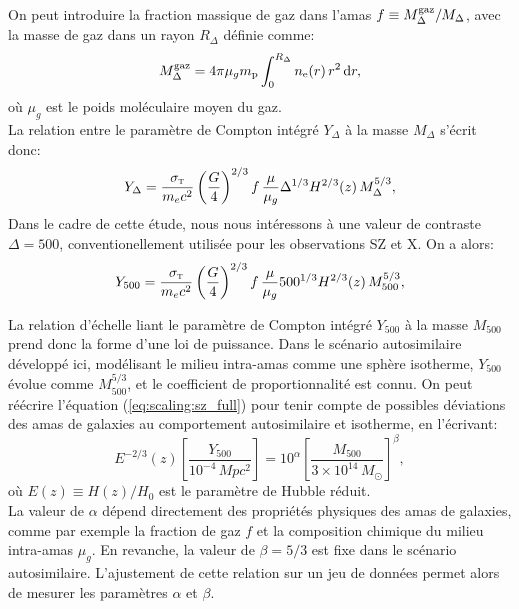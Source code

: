 On peut introduire la fraction massique de gaz dans l'amas $f \equiv M_\Delta^{\rm gaz} / M_\Delta$, avec la masse de gaz dans un rayon $R_\Delta$ définie comme:
\begin{equation}
    M_\Delta^{\rm gaz} = 4\pi \mu_g m_{\rm p} \int_0^{R_\Delta} n_{\rm e}(r) \, r^2 \, \mathrm{d} r,
\end{equation}
où $\mu_g$ est le poids moléculaire moyen du gaz. \\
La relation entre le paramètre de Compton intégré $Y_\Delta$ à la masse $M_\Delta$ s'écrit donc:
\begin{equation}
    Y_\Delta = \frac{\sigma_\textsc{t}}{m_e c^2} \left(\frac{G}{4}\right)^{2/3} f\, \frac{\mu}{\mu_g} \Delta^{1/3} H^{2/3}(z) \, M_\Delta^{5/3},
\end{equation}
Dans le cadre de cette étude, nous nous intéressons à une valeur de contraste $\Delta=500$, conventionellement utilisée pour les observations SZ et X.
On a alors:
\begin{equation}
    \label{eq:scaling:sz_full}
    Y_{500} = \frac{\sigma_\textsc{t}}{m_e c^2} \left(\frac{G}{4}\right)^{2/3} f\, \frac{\mu}{\mu_g} 500^{1/3} H^{2/3}(z) \, M_{500}^{5/3},
\end{equation}

La relation d'échelle liant le paramètre de Compton intégré $Y_{500}$ à la masse $M_{500}$ prend donc la forme d'une loi de puissance.
Dans le scénario autosimilaire développé ici, modélisant le milieu intra-amas comme une sphère isotherme, $Y_{500}$ évolue comme $M_{500}^{5/3}$, et le coefficient de proportionnalité est connu.
On peut réécrire l'équation (\ref{eq:scaling:sz_full}) pour tenir compte de possibles déviations des amas de galaxies au comportement autosimilaire et isotherme, en l'écrivant:
\begin{equation}
    \label{eq:sz_scaling}
    E^{-2/3}(z) \left[\frac{Y_{500}}{10^{-4} \,\unit{Mpc^2}}\right] = 10^\alpha \left[\frac{M_{500}}{3 \times 10^{14} \,M_\odot}\right]^\beta,
\end{equation}
où $E(z) \equiv H(z)/H_0$ est le paramètre de Hubble réduit. \\
La valeur de $\alpha$ dépend directement des propriétés physiques des amas de galaxies, comme par exemple la fraction de gaz $f$ et la composition chimique du milieu intra-amas $\mu_g$.
En revanche, la valeur de $\beta = 5/3$ est fixe dans le scénario autosimilaire.
L'ajustement de cette relation sur un jeu de données permet alors de mesurer les paramètres $\alpha$ et $\beta$.

